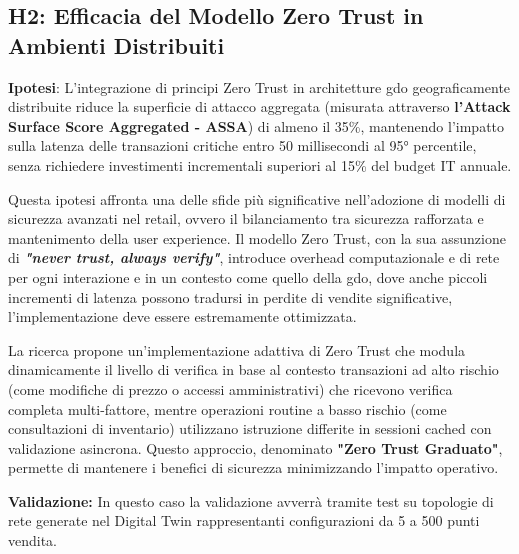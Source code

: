 \subsection{H2: Efficacia del Modello Zero Trust in Ambienti Distribuiti}

\label{ssec:h2}
\textbf{Ipotesi}: L'integrazione di principi Zero Trust in architetture \gls{gdo} geograficamente distribuite riduce la superficie di attacco aggregata (misurata attraverso \textbf{l'Attack Surface Score Aggregated - ASSA}) di almeno il 35\%, mantenendo l'impatto sulla latenza delle transazioni critiche entro 50 millisecondi al 95° percentile, senza richiedere investimenti incrementali superiori al 15\% del budget IT annuale.

Questa ipotesi affronta una delle sfide più significative nell'adozione di modelli di sicurezza avanzati nel retail, ovvero il bilanciamento tra sicurezza rafforzata e mantenimento della user experience. Il modello Zero Trust, con la sua assunzione di \textit{\textbf{"never trust, always verify"}}, introduce overhead computazionale e di rete per ogni interazione e in un contesto come quello della \gls{gdo}, dove anche piccoli incrementi di latenza possono tradursi in perdite di vendite significative, l'implementazione deve essere estremamente ottimizzata.

La ricerca propone un'implementazione adattiva di Zero Trust che modula dinamicamente il livello di verifica in base al contesto transazioni ad alto rischio (come modifiche di prezzo o accessi amministrativi) che ricevono verifica completa multi-fattore, mentre operazioni routine a basso rischio (come consultazioni di inventario) utilizzano istruzione differite in sessioni cached con validazione asincrona. Questo approccio, denominato \textbf{"Zero Trust Graduato"}, permette di mantenere i benefici di sicurezza minimizzando l'impatto operativo.

\textbf{Validazione:} In questo caso la validazione avverrà tramite test su topologie di rete generate nel Digital Twin rappresentanti configurazioni da 5 a 500 punti vendita.

